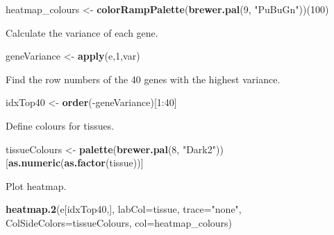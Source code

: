 \documentclass[]{book}
\newenvironment{Shaded}{\begin{snugshade}}{\end{snugshade}}
\newcommand{\KeywordTok}[1]{\textcolor[rgb]{0.13,0.29,0.53}{\textbf{{#1}}}}
\newcommand{\DataTypeTok}[1]{\textcolor[rgb]{0.13,0.29,0.53}{{#1}}}
\newcommand{\DecValTok}[1]{\textcolor[rgb]{0.00,0.00,0.81}{{#1}}}
\newcommand{\StringTok}[1]{\textcolor[rgb]{0.31,0.60,0.02}{{#1}}}
\newcommand{\NormalTok}[1]{{#1}}
\theoremstyle{definition}
\theoremstyle{definition}
\theoremstyle{definition}
\theoremstyle{remark}
\begin{document}
\begin{Shaded}
\begin{Highlighting}[]
\NormalTok{heatmap_colours <-}\StringTok{ }\KeywordTok{colorRampPalette}\NormalTok{(}\KeywordTok{brewer.pal}\NormalTok{(}\DecValTok{9}\NormalTok{, }\StringTok{"PuBuGn"}\NormalTok{))(}\DecValTok{100}\NormalTok{)}
\end{Highlighting}
\end{Shaded}

Calculate the variance of each gene.

\begin{Shaded}
\begin{Highlighting}[]
\NormalTok{geneVariance <-}\StringTok{ }\KeywordTok{apply}\NormalTok{(e,}\DecValTok{1}\NormalTok{,var)}
\end{Highlighting}
\end{Shaded}

Find the row numbers of the 40 genes with the highest variance.

\begin{Shaded}
\begin{Highlighting}[]
\NormalTok{idxTop40 <-}\StringTok{ }\KeywordTok{order}\NormalTok{(-geneVariance)[}\DecValTok{1}\NormalTok{:}\DecValTok{40}\NormalTok{]}
\end{Highlighting}
\end{Shaded}

Define colours for tissues.

\begin{Shaded}
\begin{Highlighting}[]
\NormalTok{tissueColours <-}\StringTok{ }\KeywordTok{palette}\NormalTok{(}\KeywordTok{brewer.pal}\NormalTok{(}\DecValTok{8}\NormalTok{, }\StringTok{"Dark2"}\NormalTok{))[}\KeywordTok{as.numeric}\NormalTok{(}\KeywordTok{as.factor}\NormalTok{(tissue))]}
\end{Highlighting}
\end{Shaded}

Plot heatmap.

\begin{Shaded}
\begin{Highlighting}[]
\KeywordTok{heatmap.2}\NormalTok{(e[idxTop40,], }\DataTypeTok{labCol=}\NormalTok{tissue, }\DataTypeTok{trace=}\StringTok{"none"}\NormalTok{,}
          \DataTypeTok{ColSideColors=}\NormalTok{tissueColours, }\DataTypeTok{col=}\NormalTok{heatmap_colours)}
\end{Highlighting}
\end{Shaded}
\end{document}
